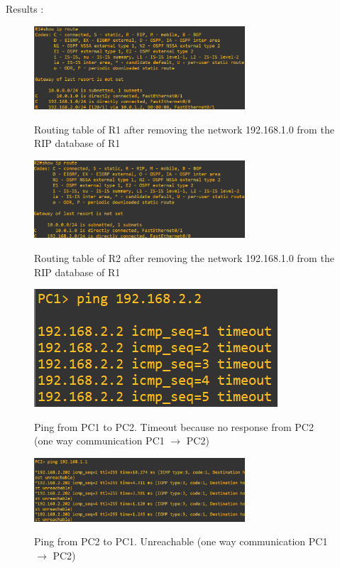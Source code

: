 \documentclass[10pt,a4paper]{ULBreport}
\begin{document}
Results :

\begin{figure}[H]
    \caption{Routing table of R1 after removing the network 192.168.1.0 from the RIP database of R1}
    \center
    \includegraphics[width=0.7\textwidth]{routeR1SERIAL.png}
    \label{routeR1se}
\end{figure}

\begin{figure}[H]
    \caption{Routing table of R2 after removing the network 192.168.1.0 from the RIP database of R1}
    \center
    \includegraphics[width=0.7\textwidth]{routeR2SERIAL.png}
    \label{routeR2se}
\end{figure}

\begin{figure}[H]
    \caption{Ping from PC1 to PC2. Timeout because no response from PC2 (one way communication PC1 $\rightarrow$ PC2) }
    \center
    \includegraphics[scale=0.8]{pingPC1PC2SERIAL.png}
    \label{pingPC1PC2se}
\end{figure}

\begin{figure}[H]
    \caption{Ping from PC2 to PC1. Unreachable (one way communication PC1 $\rightarrow$ PC2)}
    \center
    \includegraphics[width=0.7\textwidth]{pingPC2PC1SERIAL.png}
    \label{pingPC2PC1se}
\end{figure}
\end{document}

